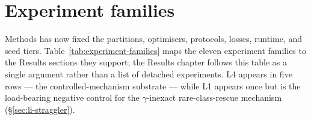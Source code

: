 \documentclass[11pt,a4paper]{report}
\begin{document}
\section{Experiment families}
\label{sec:method-roadmap}

Methods has now fixed the partitions, optimisers, protocols, losses, runtime, and
seed tiers. Table~\ref{tab:experiment-families} maps the eleven experiment families
to the Results sections they support; the Results chapter follows this table as a
single argument rather than a list of detached experiments. L4 appears in five
rows --- the controlled-mechanism substrate --- while L1 appears once but is the
load-bearing negative control for the $\gamma$-inexact rare-class-rescue mechanism
(\S\ref{sec:li-straggler}).

\begin{table}[H]
\centering
\small
\caption[Experiment families and the Results sections they support]{Experiment families and the Results sections they support. The
table bridges the design choices defined in §\ref{sec:method-problem}--§\ref{sec:method-losses}
and Results (Chapter~\ref{ch:results}). Each Results section examines
one row or a group of rows; none is presented as a detached standalone
experiment.}
\label{tab:experiment-families}
\end{table}
\end{document}
